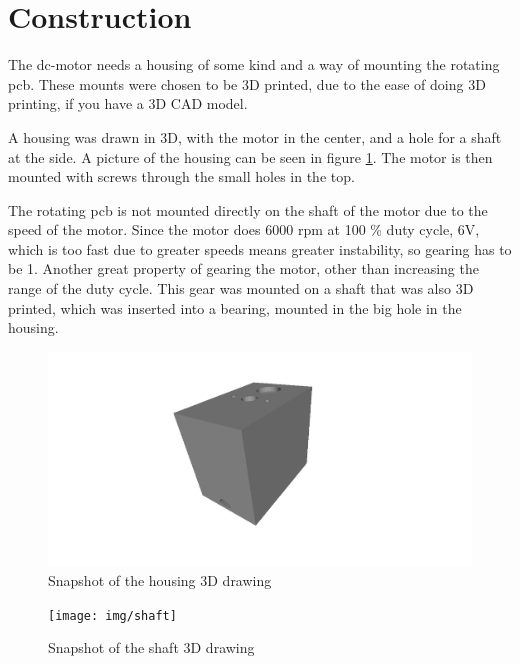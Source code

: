 \section{Construction}
The dc-motor needs a housing of some kind and a way of mounting the rotating pcb.
These mounts were chosen to be 3D printed, due to the ease of doing 3D printing, if you have a 3D CAD model.

A housing was drawn in 3D, with the motor in the center, and a hole for a shaft at the side. 
A picture of the housing can be seen in figure \ref{fig:housing3D}.
The motor is then mounted with screws through the small holes in the top.

The rotating pcb is not mounted directly on the shaft of the motor due to the speed of the motor.
Since the motor does 6000 rpm at 100 \% duty cycle, 6V, which is too fast due to greater speeds means greater instability, so gearing has to be 1.
Another great property of gearing the motor, other than increasing the range of the duty cycle.
This gear was mounted on a shaft that was also 3D printed, which was inserted into a bearing, mounted in the big hole in the housing.

\begin{figure}
 \centering
 \includegraphics[width=\textwidth]{img/housing3D}
 \caption{Snapshot of the housing 3D drawing}
 \label{fig:housing3D}
\end{figure}

\begin{figure}
 \centering
 \texttt{[image: img/shaft]}
 \caption{Snapshot of the shaft 3D drawing}
 \label{fig:shaft3D}
\end{figure}
